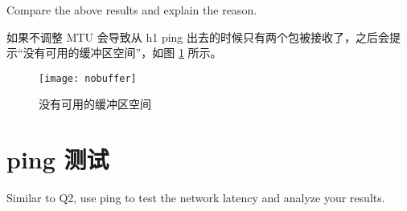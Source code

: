     Compare the above results and explain the reason. 

    如果不调整 MTU 会导致从 h1 ping 出去的时候只有两个包被接收了，之后会提示“没有可用的缓冲区空间”，如图 \ref{fig:nobuffer} 所示。

    \begin{figure}[H]
        \centering
        \texttt{[image: nobuffer]}
        \caption{没有可用的缓冲区空间}\label{fig:nobuffer}
    \end{figure}

    \section{ping 测试}
    Similar to Q2, use ping to test the network latency and analyze your results.
    
